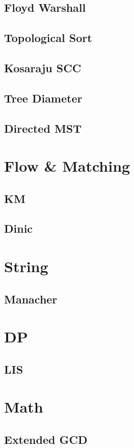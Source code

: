     \subsection{Floyd Warshall}
        
    \subsection{Topological Sort}
        
    \subsection{Kosaraju SCC}
        
    \subsection{Tree Diameter}
        
    \subsection{Directed MST}
        

\section{Flow \& Matching}
    \subsection{KM}
        
    \subsection{Dinic}
        

\section{String}
    \subsection{Manacher}
        

\section{DP}
    \subsection{LIS}
        

\section{Math}
    \subsection{Extended GCD}
        